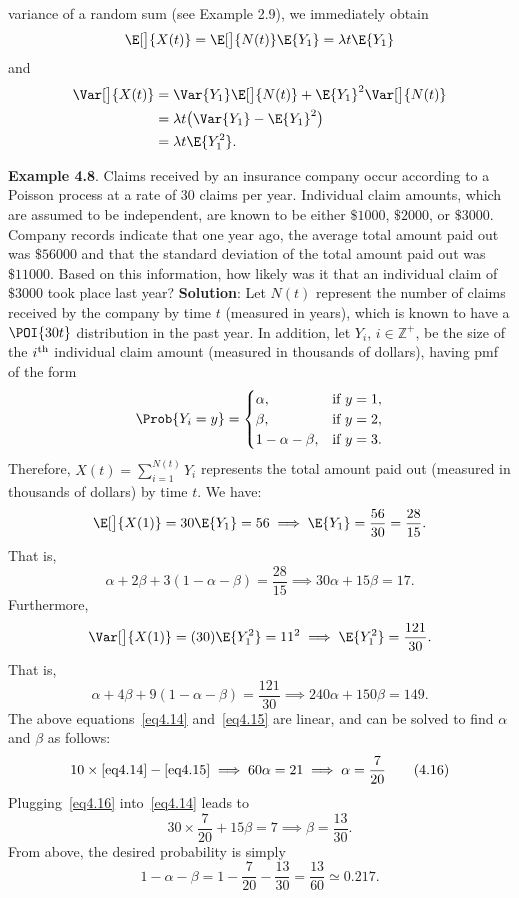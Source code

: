 \begin{Regular}
\begin{enumerate}[(1)]
              variance of a random sum (see Example 2.9), we immediately obtain
              \[ \E[\big]{X(t)}=\E[\big]{N(t)}\E{Y_1}=\lambda t\E{Y_1} \]
              and
              \begin{align*}
                  \Var[\big]{X(t)}
                   & =\Var{Y_1}\E[\big]{N(t)}+\E{Y_1}^2\Var[\big]{N(t)} \\
                   & =\lambda t\bigl(\Var{Y_1}-\E{Y_1}^2\bigr)          \\
                   & =\lambda t\E{Y_1^2}.
              \end{align*}
    \end{enumerate}
\end{Regular}
\begin{Example}
    \textbf{Example 4.8}. Claims received by an insurance company occur according to a Poisson process
    at a rate of $30$ claims per year. Individual claim amounts, which are assumed to be
    independent, are known to be either $\$1000$, $\$2000$, or $\$3000$. Company records indicate that
    one year ago, the average total amount paid out was $\$56000$ and that the standard deviation
    of the total amount paid out was $\$11000$. Based on this information, how likely was it that an
    individual claim of $\$3000$ took place last year?
    \tcblower{}
    \textbf{Solution}: Let $ N(t) $ represent the number of claims received by the company
    by time $ t $ (measured in years), which is known to have a $ \POI{30t} $
    distribution in the past year. In addition, let $ Y_i $, $ i\in\mathbb{Z}^+ $,
    be the size of the $ i\textsuperscript{th} $ individual claim amount (measured in thousands of dollars),
    having pmf of the form
    \[ \Prob{Y_i=y}=\begin{cases}
            \alpha,         & \text{if $y=1$}, \\
            \beta,          & \text{if $y=2$}, \\
            1-\alpha-\beta, & \text{if $y=3$}.
        \end{cases} \]
    Therefore, $ X(t)=\sum_{i=1}^{N(t)}Y_i $ represents the total amount paid out (measured in thousands of dollars) by time $ t $.
    We have:
    \[ \E[\big]{X(1)}=30\E{Y_1}=56\implies \E{Y_1}=\frac{56}{30}=\frac{28}{15}. \]
    That is,
    \[ \alpha+2\beta+3(1-\alpha-\beta)=\frac{28}{15}\implies 30\alpha+15\beta=17.\label{eq4.14}\tag*{(4.14)} \]
    Furthermore,
    \[ \Var[\big]{X(1)}=(30)\E{Y_1^2}=11^2\implies \E{Y_1^2}=\frac{121}{30}. \]
    That is,
    \[ \alpha+4\beta+9(1-\alpha-\beta)=\frac{121}{30}\implies 240\alpha+150\beta=149.\label{eq4.15}\tag*{(4.15)} \]
    The above equations~\ref{eq4.14} and~\ref{eq4.15} are linear, and can be solved to find $ \alpha $ and $ \beta $ as follows:
    \[ 10\times\ref{eq4.14}-\ref{eq4.15}\implies 60\alpha=21\implies \alpha=\frac{7}{20}\label{eq4.16}\tag*{(4.16)} \]
    Plugging~\ref{eq4.16} into~\ref{eq4.14} leads to
    \[ 30\times \frac{7}{20}+15\beta=7\implies \beta=\frac{13}{30}. \]
    From above, the desired probability is simply
    \[ 1-\alpha-\beta=1-\frac{7}{20}-\frac{13}{30}=\frac{13}{60}\simeq 0.217. \]
\end{Example}